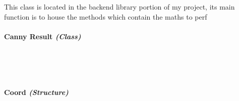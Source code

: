\begin{FlushLeft}
\begin{enumerate}
    This class is located in the backend library portion of my project, its main function is to house the methods which contain the maths to perf

    \bk


    \paragraph{Canny Result \textit{(Class)}} \mbox{} \\

    \begin{figure}[H]
        \centering
    \end{figure}\\

    \bk

    \paragraph{Coord \textit{(Structure)}} \mbox{} \\

    \begin{figure}[H]
        \centering
    \end{figure}\\


\end{enumerate}
\end{FlushLeft}
